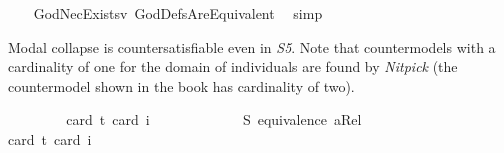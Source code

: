 \begin{isabellebody}
%
\isadelimproof
\ \ %
\endisadelimproof
%
\isatagproof
{}\isamarkupfalse%
\ GodNecExists{\isacharunderscore}v{}\ GodDefsAreEquivalent\ \isamarkupfalse%
\ simp%
\endisatagproof
{\isafoldproof}%
%
\isadelimproof
%
\endisadelimproof
%
\isamarkuptrue%
%
\begin{isamarkuptext}%
Modal collapse is countersatisfiable even in \emph{S5}. Note that countermodels with a cardinality of one 
for the domain of individuals are found by \emph{Nitpick} (the countermodel shown in the book has cardinality of two).%
\end{isamarkuptext}\isamarkuptrue%
\isamarkupfalse%
\ {\isachardoublequoteopen}{\isasymlfloor}\isactrlbold {\isasymforall}{\isasymPhi}{\isachardot}{\isacharparenleft}{\isasymPhi}\ \isactrlbold {\isasymrightarrow}\ {\isacharparenleft}\isactrlbold {\isasymbox}\ {\isasymPhi}{\isacharparenright}{\isacharparenright}{\isasymrfloor}{\isachardoublequoteclose}\ \isanewline
\ \ \isamarkupfalse%
{\isacharbrackleft}card\ {\isacharprime}t{\isacharequal}{}{\isacharcomma}\ card\ i{\isacharequal}{}{\isacharbrackright}%
\isadelimproof
\ %
\endisadelimproof
%
\isatagproof
{}\isamarkupfalse%
\ %
%
\endisatagproof
{\isafoldproof}%
%
\isadelimproof
%
\endisadelimproof
\isanewline
\ \ \ \ \isanewline
{}\isamarkupfalse%
\ \isanewline
\ \ \ S{}{\isacharcolon}\ {\isachardoublequoteopen}equivalence\ aRel{\isachardoublequoteclose}\ %
\isanewline
\ \ \ \isanewline
{}\isamarkupfalse%
\ {\isachardoublequoteopen}{\isasymlfloor}\isactrlbold {\isasymforall}{\isasymPhi}{\isachardot}{\isacharparenleft}{\isasymPhi}\ \isactrlbold {\isasymrightarrow}\ {\isacharparenleft}\isactrlbold {\isasymbox}\ {\isasymPhi}{\isacharparenright}{\isacharparenright}{\isasymrfloor}{\isachardoublequoteclose}\ \isanewline
\ \ \isamarkupfalse%
{\isacharbrackleft}card\ {\isacharprime}t{\isacharequal}{}{\isacharcomma}\ card\ i{\isacharequal}{}{\isacharbrackright}%
\isadelimproof
\ %
\endisadelimproof
%
\isatagproof
{}\isamarkupfalse%
\ %
%
\endisatagproof
{\isafoldproof}%
%
\isadelimproof
%
\endisadelimproof
%
\begin{isamarkuptext}%
\pagebreak%
\end{isamarkuptext}\isamarkuptrue%
%
\isadelimtheory
%
\endisadelimtheory
%
\isatagtheory
%
\endisatagtheory
{\isafoldtheory}%
%
\isadelimtheory
%
\endisadelimtheory
%
\end{isabellebody}%
